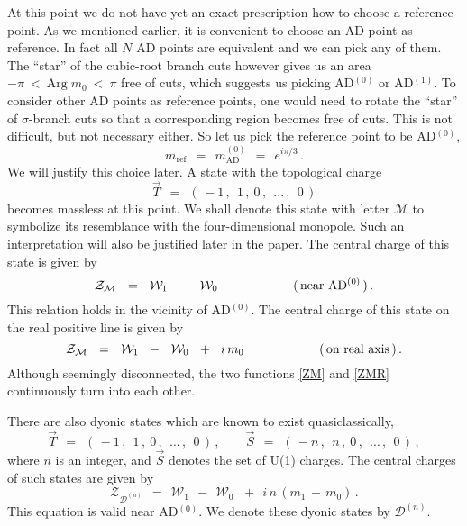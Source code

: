 \documentclass[epsfig,12pt]{article}
\def\beq{\begin{equation}}
\def\eeq{\end{equation}}
\def\beq{\begin{equation}}
\def\eeq{\end{equation}}
\newcommand{\mc}[1]{\mathcal{#1}}
\newcommand{\W}{\mathcal{W}}
\begin{document}
	At this point we do not have yet an exact prescription how to choose a reference point.
	As we mentioned earlier, it is convenient to choose an AD point as reference.
	In fact all $ N $ AD points are equivalent and we can pick any of them.
	The ``star'' of the cubic-root branch cuts however gives us 
	an area $  -\pi ~<~ \text{Arg}\; m_0 ~<~ \pi $ free of cuts,
	which suggests us picking AD$^{(0)}$ or AD$^{(1)}$.
	To consider other AD points as reference points, 
	one would need to rotate the ``star'' of $\sigma$-branch cuts so that a corresponding region becomes
	free of cuts.
	This is not difficult, but not necessary either.
	So let us pick the reference point to be AD$^{(0)}$, 
\beq
	m_\text{ref} ~~=~~ m_\text{AD}^{(0)} ~~=~~ e^{i \pi / 3}\,.
\eeq
	We will justify this choice later.
	A state with the topological charge
\beq
	\vec{T} ~~=~~ (\, -1\,,~~ 1\,,~ 0 \,,~~ ...\,,~~ 0 \,)
\eeq
	becomes massless at this point.
	We shall denote this state with letter $ \mc{M} $ to symbolize its resemblance with 
	the four-dimensional monopole. 
	Such an interpretation will also be justified later in the paper.
	The central charge of this state is given by
\beq
\label{ZM}
	\mc{Z_M} ~~=~~ \W_1 ~~-~~ \W_0
	\qquad\qquad\qquad
	\text{(\,near AD$^{(0)}$\,)\,.}
\eeq
	This relation holds in the vicinity of AD$^{(0)}$.
	The central charge of this state on the real positive line is given by
\beq
\label{ZMR}
	\mc{Z_M} ~~=~~ \W_1 ~~-~~ \W_0 ~~+~~ i\, m_0
	\qquad\qquad\qquad
	\text{(\,on real axis\,)\,.}
\eeq
	Although seemingly disconnected, the two functions \eqref{ZM} and \eqref{ZMR} 
	continuously turn into each other.

	There are also dyonic states which are known to exist quasiclassically,
\beq
	\vec{T} ~~=~~ (\, -1\,,~~ 1\,,~ 0 \,,~~ ...\,,~~ 0 \,)\,, \qquad
	\vec{S} ~~=~~ (\, -n\,,~~ n\,,~ 0 \,,~~ ...\,,~~ 0 \,)\,, 
\eeq
	where $ n $ is an integer, and $ \vec{S} $ denotes the set of U(1) charges.
	The central charges of such states are given by 
\beq
	\mc{Z}_{\mc{D}^{(n)}} ~~=~~ \W_1 ~~-~~ \W_0\, ~~+~~ i\, n\, ( m_1 \,-\, m_0 ) \,.
\eeq
	This equation is valid near AD$^{(0)}$.
	We denote these dyonic states by $ \mc{D}^{(n)} $.
\end{document}
